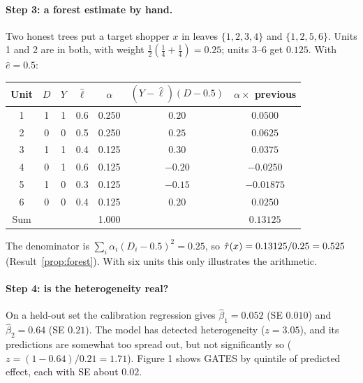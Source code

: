 \documentclass[11pt]{article}
\begin{document}
\paragraph{Step 3: a forest estimate by hand.} Two honest trees put a target shopper $x$ in leaves $\{1,2,3,4\}$ and
$\{1,2,5,6\}$. Units 1 and 2 are in both, with weight $\tfrac12(\tfrac14 + \tfrac14) = 0.25$; units 3--6 get $0.125$.
With $\hat e = 0.5$:
\begin{center}
\begin{tabular}{ccccccc}
\toprule
Unit & $D$ & $Y$ & $\hat\ell$ & $\alpha$ & $(Y - \hat\ell)(D - 0.5)$ & $\alpha \times$ previous \\
\midrule
1 & 1 & 1 & 0.6 & 0.250 & $0.20$ & $0.0500$ \\
2 & 0 & 0 & 0.5 & 0.250 & $0.25$ & $0.0625$ \\
3 & 1 & 1 & 0.4 & 0.125 & $0.30$ & $0.0375$ \\
4 & 0 & 1 & 0.6 & 0.125 & $-0.20$ & $-0.0250$ \\
5 & 1 & 0 & 0.3 & 0.125 & $-0.15$ & $-0.01875$ \\
6 & 0 & 0 & 0.4 & 0.125 & $0.20$ & $0.0250$ \\
\midrule
Sum & & & & 1.000 & & $0.13125$ \\
\bottomrule
\end{tabular}
\end{center}
The denominator is $\sum_i \alpha_i(D_i - 0.5)^2 = 0.25$, so $\hat{\tau}(x) = 0.13125/0.25 = 0.525$ (Result~\ref{prop:forest}).
With six units this only illustrates the arithmetic.

\paragraph{Step 4: is the heterogeneity real?} On a held-out set the calibration regression gives $\hat\beta_1 = 0.052$
(SE $0.010$) and $\hat\beta_2 = 0.64$ (SE $0.21$). The model has detected heterogeneity ($z = 3.05$), and its
predictions are somewhat too spread out, but not significantly so ($z = (1 - 0.64)/0.21 = 1.71$). Figure 1 shows
GATES by quintile of predicted effect, each with SE about $0.02$.
\end{document}
